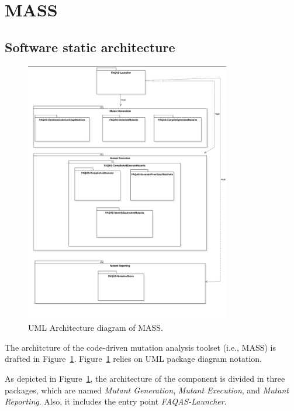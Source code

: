 
\section{MASS}

\subsection{Software static architecture}





\begin{figure}[h]
  \centering
	\includegraphics[width=0.8\textwidth]{images/static_architecture.png}
      \caption{UML Architecture diagram of MASS.}
      \label{fig:architecture_diagram}
\end{figure}

The architcture of the code-driven mutation analysis toolset (i.e., MASS)  is drafted in Figure~\ref{fig:architecture_diagram}.
Figure~\ref{fig:architecture_diagram} relies on UML package diagram notation. 

As depicted in Figure~\ref{fig:architecture_diagram}, the architecture of the component is divided in three packages, which are named \textit{Mutant Generation}, \textit{Mutant Execution}, and \textit{Mutant Reporting}. Also, it includes the entry point \textit{FAQAS-Launcher}. 

